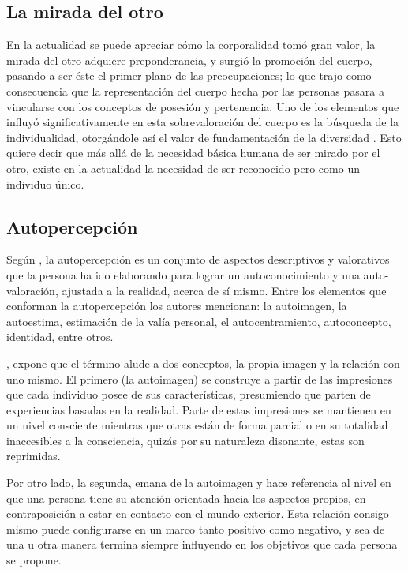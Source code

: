 \subsection{La mirada del otro}

En la actualidad se puede apreciar cómo la corporalidad tomó gran valor,  la
mirada del otro adquiere preponderancia, y surgió la promoción del cuerpo,
pasando a ser éste el primer plano de las preocupaciones; lo que trajo como
consecuencia que la representación del cuerpo hecha por las personas pasara a
vincularse con los conceptos de posesión y pertenencia. Uno de los elementos que
influyó significativamente en esta sobrevaloración del cuerpo es la búsqueda de
la individualidad, otorgándole así el valor de fundamentación de la diversidad
\parencite{LeBreton1994}. Esto quiere decir que más allá de la necesidad básica
humana de ser mirado por el otro, existe en la actualidad  la necesidad de ser
reconocido pero como un individuo único.

\subsection{Autopercepción}

Según \textcite{Exner1998}, la autopercepción es un conjunto de aspectos
descriptivos y valorativos que la persona ha ido elaborando para lograr un
autoconocimiento y una auto-valoración, ajustada a la realidad, acerca de sí
mismo. Entre los elementos que conforman la autopercepción los autores
mencionan: la autoimagen, la autoestima, estimación de la valía personal, el
autocentramiento, autoconcepto, identidad, entre otros.

\textcite{Exner2000}, expone que el término alude a dos conceptos, la propia
imagen y la relación con uno mismo. El primero (la autoimagen) se construye a
partir de las impresiones que cada individuo posee de sus características,
presumiendo que parten de experiencias basadas en la realidad. Parte de estas
impresiones se mantienen en un nivel consciente mientras que otras están de
forma parcial o en su totalidad inaccesibles a la consciencia, quizás por su
naturaleza disonante, estas son reprimidas.

Por otro lado, la segunda, emana de la autoimagen y hace referencia al nivel en
que una persona tiene su atención orientada hacia los aspectos propios, en
contraposición a estar en contacto con el mundo exterior. Esta relación consigo
mismo puede configurarse en un marco tanto positivo como negativo, y sea de una
u otra manera termina siempre influyendo en los objetivos que cada persona se
propone.

